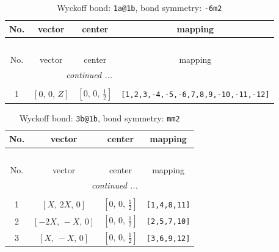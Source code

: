 \documentclass[fleqn,8pt]{jsarticle}
\begin{document}
\begin{longtable}{cccc}
\caption{Wyckoff bond: {\tt 1a@1b}, bond symmetry: {\tt -6m2}}
 \\
 \hline \hline
No. & vector & center & mapping \\ \hline \endfirsthead

\multicolumn{3}{l}{\tablename\ \thetable{}} \\
 \hline \hline
No. & vector & center & mapping \\ \hline \endhead

 \hline \hline
\multicolumn{3}{r}{\footnotesize\it continued ...} \\ \endfoot

 \hline \hline
\multicolumn{3}{r}{} \\ \endlastfoot

1 & $\left[ 0,\, 0,\, Z \right]$ & $\left[ 0,\, 0,\, \frac{1}{2} \right]$ & {\tt [1,2,3,-4,-5,-6,7,8,9,-10,-11,-12]} \\
\end{longtable}
\renewcommand{\arraystretch}{1.2}
\begin{longtable}{cccc}
\caption{Wyckoff bond: {\tt 3b@1b}, bond symmetry: {\tt mm2}}
 \\
 \hline \hline
No. & vector & center & mapping \\ \hline \endfirsthead

\multicolumn{3}{l}{\tablename\ \thetable{}} \\
 \hline \hline
No. & vector & center & mapping \\ \hline \endhead

 \hline \hline
\multicolumn{3}{r}{\footnotesize\it continued ...} \\ \endfoot

 \hline \hline
\multicolumn{3}{r}{} \\ \endlastfoot

1 & $\left[ X,\, 2 X,\, 0 \right]$ & $\left[ 0,\, 0,\, \frac{1}{2} \right]$ & {\tt [1,4,8,11]} \\ \hline
2 & $\left[ - 2 X,\, - X,\, 0 \right]$ & $\left[ 0,\, 0,\, \frac{1}{2} \right]$ & {\tt [2,5,7,10]} \\ \hline
3 & $\left[ X,\, - X,\, 0 \right]$ & $\left[ 0,\, 0,\, \frac{1}{2} \right]$ & {\tt [3,6,9,12]} \\
\end{longtable}
\renewcommand{\arraystretch}{1.2}
\end{document}
